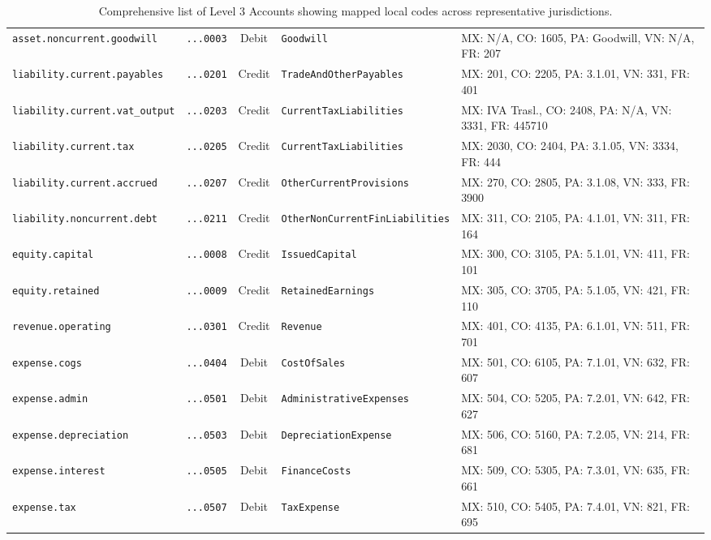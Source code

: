\begin{table}[H]
{\begin{tabular}{llclp{6.5cm}}
\texttt{asset.noncurrent.goodwill} & \texttt{...0003} & Debit & \texttt{Goodwill} & MX: N/A, CO: 1605, PA: Goodwill, VN: N/A, FR: 207 \\
\texttt{liability.current.payables} & \texttt{...0201} & Credit & \texttt{TradeAndOtherPayables} & MX: 201, CO: 2205, PA: 3.1.01, VN: 331, FR: 401 \\
\texttt{liability.current.vat\_output} & \texttt{...0203} & Credit & \texttt{CurrentTaxLiabilities} & MX: IVA Trasl., CO: 2408, PA: N/A, VN: 3331, FR: 445710 \\
\texttt{liability.current.tax} & \texttt{...0205} & Credit & \texttt{CurrentTaxLiabilities} & MX: 2030, CO: 2404, PA: 3.1.05, VN: 3334, FR: 444 \\
\texttt{liability.current.accrued} & \texttt{...0207} & Credit & \texttt{OtherCurrentProvisions} & MX: 270, CO: 2805, PA: 3.1.08, VN: 333, FR: 3900 \\
\texttt{liability.noncurrent.debt} & \texttt{...0211} & Credit & \texttt{OtherNonCurrentFinLiabilities} & MX: 311, CO: 2105, PA: 4.1.01, VN: 311, FR: 164 \\
\texttt{equity.capital} & \texttt{...0008} & Credit & \texttt{IssuedCapital} & MX: 300, CO: 3105, PA: 5.1.01, VN: 411, FR: 101 \\
\texttt{equity.retained} & \texttt{...0009} & Credit & \texttt{RetainedEarnings} & MX: 305, CO: 3705, PA: 5.1.05, VN: 421, FR: 110 \\
\texttt{revenue.operating} & \texttt{...0301} & Credit & \texttt{Revenue} & MX: 401, CO: 4135, PA: 6.1.01, VN: 511, FR: 701 \\
\texttt{expense.cogs} & \texttt{...0404} & Debit & \texttt{CostOfSales} & MX: 501, CO: 6105, PA: 7.1.01, VN: 632, FR: 607 \\
\texttt{expense.admin} & \texttt{...0501} & Debit & \texttt{AdministrativeExpenses} & MX: 504, CO: 5205, PA: 7.2.01, VN: 642, FR: 627 \\
\texttt{expense.depreciation} & \texttt{...0503} & Debit & \texttt{DepreciationExpense} & MX: 506, CO: 5160, PA: 7.2.05, VN: 214, FR: 681 \\
\texttt{expense.interest} & \texttt{...0505} & Debit & \texttt{FinanceCosts} & MX: 509, CO: 5305, PA: 7.3.01, VN: 635, FR: 661 \\
\texttt{expense.tax} & \texttt{...0507} & Debit & \texttt{TaxExpense} & MX: 510, CO: 5405, PA: 7.4.01, VN: 821, FR: 695 \\
\bottomrule
\end{tabular}%
}
\caption{Comprehensive list of Level 3 Accounts showing mapped local codes across representative jurisdictions.}
\label{tab:l3_accounts}
\end{table}

